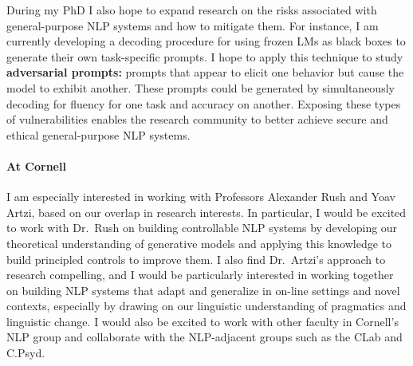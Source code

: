 \documentclass[11pt]{article}
\newcommand\inst{Cornell\xspace}
\begin{document}
During my PhD I also hope to expand research on the risks associated 
with general-purpose NLP systems and how to mitigate them.
For instance, I am currently developing a decoding procedure 
for using frozen LMs as black boxes
to generate their own task-specific prompts.
I hope to apply this technique
to study \textbf{adversarial prompts:}
prompts that appear to elicit one behavior 
but cause the model to exhibit another.
These prompts could be generated by simultaneously 
decoding for fluency for one task and accuracy on another.
Exposing these types of vulnerabilities
enables the research community to better achieve
secure and ethical general-purpose NLP systems. 

\paragraph{At \inst} 

I am especially interested in working 
with Professors Alexander Rush and Yoav Artzi,
based on our overlap in research interests. 
In particular, I would be excited to work with Dr.\ Rush 
on building controllable NLP systems 
by developing our theoretical understanding of generative models 
and applying this knowledge to build principled controls to improve them. 
I also find Dr.\ Artzi's approach to research compelling, 
and I would be particularly interested in working together 
on building NLP systems that adapt and generalize in on-line settings
and novel contexts, especially by drawing on our linguistic understanding of pragmatics and linguistic change.
I would also be excited to work with other faculty in Cornell's NLP group
and collaborate with the NLP-adjacent groups such as the CLab and C.Psyd.




\end{document}
